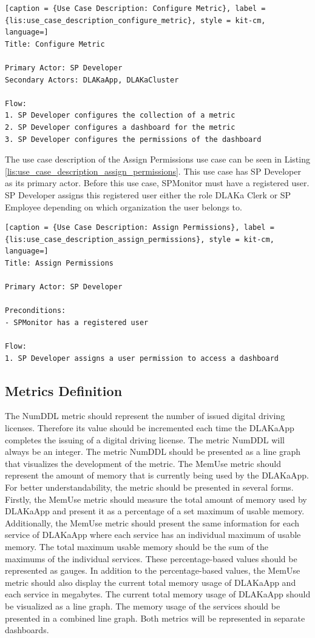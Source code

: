 \begin{lstlisting}[caption = {Use Case Description: Configure Metric}, label = {lis:use_case_description_configure_metric}, style = kit-cm, language=]
Title: Configure Metric

Primary Actor: SP Developer
Secondary Actors: DLAKaApp, DLAKaCluster

Flow:
1. SP Developer configures the collection of a metric
2. SP Developer configures a dashboard for the metric
3. SP Developer configures the permissions of the dashboard
\end{lstlisting}

The use case description of the Assign Permissions use case can be seen in Listing \ref{lis:use_case_description_assign_permissions}.
This use case has SP Developer as its primary actor. Before this use case,
SPMonitor must have a registered user. SP Developer assigns this registered user
either the role DLAKa Clerk or SP Employee depending on which organization the user belongs to.

\begin{lstlisting}[caption = {Use Case Description: Assign Permissions}, label = {lis:use_case_description_assign_permissions}, style = kit-cm, language=]
Title: Assign Permissions

Primary Actor: SP Developer

Preconditions:
- SPMonitor has a registered user

Flow:
1. SP Developer assigns a user permission to access a dashboard
\end{lstlisting}

\subsection{Metrics Definition}
The NumDDL metric should represent the number of issued digital driving licenses.
Therefore its value should be incremented each time the DLAKaApp completes the issuing of
a digital driving license. The metric NumDDL will always be an integer.
The metric NumDDL should be presented as a line graph that visualizes the development
of the metric.
The MemUse metric should represent the amount of memory that is currently being used by the
DLAKaApp. For better understandability, the metric should be presented in several forms.
Firstly, the MemUse metric should measure the total amount of memory used by DLAKaApp
and present it as a percentage of a set maximum of usable memory. Additionally,
the MemUse metric should present the same information for each service
of DLAKaApp where each service has an individual maximum of usable memory.
The total maximum usable memory should be the sum of the maximums of the individual services.
These percentage-based values should be represented as gauges.
In addition to the percentage-based values, the MemUse metric should also
display the current total memory usage of DLAKaApp and each service
in megabytes. The current total memory usage of DLAKaApp should be visualized as a line graph.
The memory usage of the services should be presented in a combined line graph.
Both metrics will be represented in separate dashboards.

